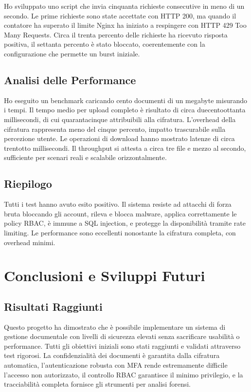 \documentclass[12pt, a4paper]{article}
\begin{document}
Ho sviluppato uno script che invia cinquanta richieste consecutive in meno di un secondo. Le prime richieste sono state accettate con HTTP 200, ma quando il contatore ha superato il limite Nginx ha iniziato a respingere con HTTP 429 Too Many Requests. Circa il trenta percento delle richieste ha ricevuto risposta positiva, il settanta percento è stato bloccato, coerentemente con la configurazione che permette un burst iniziale.

\subsection{Analisi delle Performance}

Ho eseguito un benchmark caricando cento documenti di un megabyte misurando i tempi. Il tempo medio per upload completo è risultato di circa duecentoottanta millisecondi, di cui quarantacinque attribuibili alla cifratura. L'overhead della cifratura rappresenta meno del cinque percento, impatto trascurabile sulla percezione utente. Le operazioni di download hanno mostrato latenze di circa trentotto millisecondi. Il throughput si attesta a circa tre file e mezzo al secondo, sufficiente per scenari reali e scalabile orizzontalmente.

\subsection{Riepilogo}

Tutti i test hanno avuto esito positivo. Il sistema resiste ad attacchi di forza bruta bloccando gli account, rileva e blocca malware, applica correttamente le policy RBAC, è immune a SQL injection, e protegge la disponibilità tramite rate limiting. Le performance sono eccellenti nonostante la cifratura completa, con overhead minimi.

\newpage

\section{Conclusioni e Sviluppi Futuri}

\subsection{Risultati Raggiunti}

Questo progetto ha dimostrato che è possibile implementare un sistema di gestione documentale con livelli di sicurezza elevati senza sacrificare usabilità o performance. Tutti gli obiettivi iniziali sono stati raggiunti e validati attraverso test rigorosi. La confidenzialità dei documenti è garantita dalla cifratura automatica, l'autenticazione robusta con MFA rende estremamente difficile l'accesso non autorizzato, il controllo RBAC garantisce il minimo privilegio, e la tracciabilità completa fornisce gli strumenti per analisi forensi.
\end{document}
